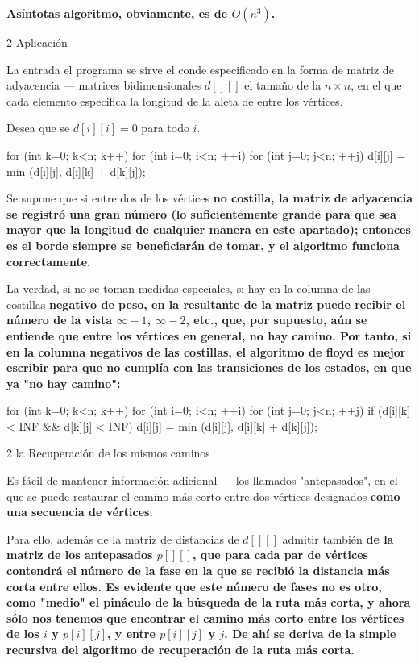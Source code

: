 \bf{Asíntotas} algoritmo, obviamente, es de $O (n^3)$.


\h2{ Aplicación }

La entrada el programa se sirve el conde especificado en la forma de matriz de adyacencia --- matrices bidimensionales $d[][]$ el tamaño de la $n \times n$, en el que cada elemento especifica la longitud de la aleta de entre los vértices.

Desea que se $d[i][i] = 0$ para todo $i$.

\code
for (int k=0; k<n; k++)
for (int i=0; i<n; ++i)
for (int j=0; j<n; ++j)
d[i][j] = min (d[i][j], d[i][k] + d[k][j]);
\endcode

Se supone que si entre dos de los vértices \bf{no costilla}, la matriz de adyacencia se registró una gran número (lo suficientemente grande para que sea mayor que la longitud de cualquier manera en este apartado); entonces es el borde siempre se beneficiarán de tomar, y el algoritmo funciona correctamente.

La verdad, si no se toman medidas especiales, si hay en la columna de las costillas \bf{negativo de peso}, en la resultante de la matriz puede recibir el número de la vista $\infty-1$, $\infty-2$, etc., que, por supuesto, aún se entiende que entre los vértices en general, no hay camino. Por tanto, si en la columna negativos de las costillas, el algoritmo de floyd es mejor escribir para que no cumplía con las transiciones de los estados, en que ya "no hay camino":

\code
for (int k=0; k<n; k++)
for (int i=0; i<n; ++i)
for (int j=0; j<n; ++j)
if (d[i][k] < INF && d[k][j] < INF)
d[i][j] = min (d[i][j], d[i][k] + d[k][j]);
\endcode


\h2{ la Recuperación de los mismos caminos }

Es fácil de mantener información adicional --- los llamados "antepasados", en el que se puede restaurar el camino más corto entre dos vértices designados \bf{como una secuencia de vértices}.

Para ello, además de la matriz de distancias de $d[][]$ admitir también \bf{de la matriz de los antepasados} $p[][]$, que para cada par de vértices contendrá el número de la fase en la que se recibió la distancia más corta entre ellos. Es evidente que este número de fases no es otro, como "medio" el pináculo de la búsqueda de la ruta más corta, y ahora sólo nos tenemos que encontrar el camino más corto entre los vértices de los $i$ y $p[i][j]$, y entre $p[i][j]$ y $j$. De ahí se deriva de la simple recursiva del algoritmo de recuperación de la ruta más corta.


